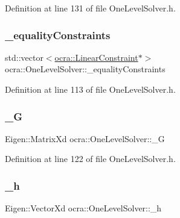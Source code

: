 Definition at line 131 of file One\+Level\+Solver.\+h.

\hypertarget{classocra_1_1OneLevelSolver_a482b16a5c6e8a17c62b0a55a006f9c91}{}\label{classocra_1_1OneLevelSolver_a482b16a5c6e8a17c62b0a55a006f9c91} 
\subsubsection{\texorpdfstring{\+\_\+equality\+Constraints}{\_equalityConstraints}}
{\footnotesize\ttfamily std\+::vector$<$\hyperlink{namespaceocra_ae8b87cf4099be3efc3b410019ad2046e}{ocra\+::\+Linear\+Constraint}$\ast$$>$ ocra\+::\+One\+Level\+Solver\+::\+\_\+equality\+Constraints\hspace{0.3cm}{\ttfamily [protected]}}



Definition at line 113 of file One\+Level\+Solver.\+h.

\hypertarget{classocra_1_1OneLevelSolver_a01deacde23d6655fee88be9977636a5a}{}\label{classocra_1_1OneLevelSolver_a01deacde23d6655fee88be9977636a5a} 
\subsubsection{\texorpdfstring{\+\_\+G}{\_G}}
{\footnotesize\ttfamily Eigen\+::\+Matrix\+Xd ocra\+::\+One\+Level\+Solver\+::\+\_\+G\hspace{0.3cm}{\ttfamily [protected]}}



Definition at line 122 of file One\+Level\+Solver.\+h.

\hypertarget{classocra_1_1OneLevelSolver_a8d4cbb48bc63b7b1b3f11603516ef120}{}\label{classocra_1_1OneLevelSolver_a8d4cbb48bc63b7b1b3f11603516ef120} 
\subsubsection{\texorpdfstring{\+\_\+h}{\_h}}
{\footnotesize\ttfamily Eigen\+::\+Vector\+Xd ocra\+::\+One\+Level\+Solver\+::\+\_\+h\hspace{0.3cm}{\ttfamily [protected]}}



